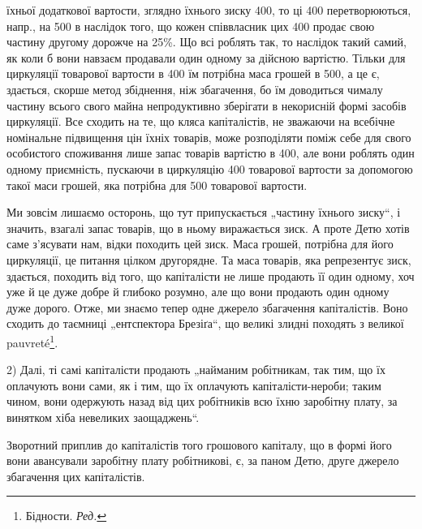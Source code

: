 \parcont{}  %
їхньої додаткової вартости, зглядно їхнього зиску \deq{} 400, то
ці 400 перетворюються, напр., на 500 в наслідок
того, що кожен співвласник цих 400 продає свою частину другому
дорожче на 25\%. Що всі роблять так, то наслідок такий самий,
як коли б вони навзаєм продавали один одному за дійсною вартістю.
Тільки для циркуляції товарової вартости в 400 їм потрібна
маса грошей в 500, а це є, здається, скорше метод збіднення,
ніж збагачення, бо їм доводиться чималу частину всього свого майна
непродуктивно зберігати в некорисній формі засобів циркуляції. Все
сходить на те, що кляса капіталістів, не зважаючи на всебічне номінальне
підвищення цін їхніх товарів, може розподіляти поміж себе для свого
особистого споживання лише запас товарів вартістю в 400, але вони роблять один одному приємність, пускаючи в циркуляцію
400 товарової вартости за допомогою такої маси грошей,
яка потрібна для 500 товарової вартости.

Ми зовсім лишаємо осторонь, що тут припускається „частину їхнього
зиску“, і значить, взагалі запас товарів, що в ньому виражається зиск.
А проте Детю хотів саме з’ясувати нам, відки походить цей зиск. Маса
грошей, потрібна для його циркуляції, це питання цілком другорядне. Та маса
товарів, яка репрезентує зиск, здається, походить від того, що капіталісти
не лише продають її один одному, хоч уже й це дуже добре й
глибоко розумно, але що вони продають один одному дуже дорого.
Отже, ми знаємо тепер одне джерело збагачення капіталістів. Воно сходить
до таємниці „ентспектора Брезіґа“, що великі злидні походять з великої
pauvreté\footnote*{
Бідности. \emph{Ред.}
}.

2) Далі, ті самі капіталісти продають „найманим робітникам, так тим,
що їх оплачують вони сами, як і тим, що їх оплачують капіталісти-нероби;
таким чином, вони одержують назад від цих робітників всю їхню заробітну
плату, за винятком хіба невеликих заощаджень“.

Зворотний приплив до капіталістів того грошового капіталу, що
в формі його вони авансували заробітну плату робітникові, є, за паном
Детю, друге джерело збагачення цих капіталістів.

